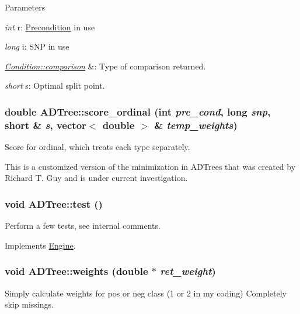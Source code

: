\begin{DoxyParams}{Parameters}
\item[{\em int}]r: \hyperlink{classPrecondition}{Precondition} in use \item[{\em long}]i: SNP in use \item[{\em \hyperlink{classCondition_af41afbd9545b1fb2e2cb4a4792d52408}{Condition::comparison}}]\&: Type of comparison returned. \item[{\em short}]s: Optimal split point. \end{DoxyParams}
\hypertarget{classADTree_ab9b3c82b61aff738c450bd3b03a27631}{
\subsubsection[{score\_\-ordinal}]{\setlength{\rightskip}{0pt plus 5cm}double ADTree::score\_\-ordinal (int {\em pre\_\-cond}, \/  long {\em snp}, \/  short \& {\em s}, \/  vector$<$ double $>$ \& {\em temp\_\-weights})}}
\label{classADTree_ab9b3c82b61aff738c450bd3b03a27631}
Score for ordinal, which treats each type separately.

This is a customized version of the minimization in ADTrees that was created by Richard T. Guy and is under current investigation. \hypertarget{classADTree_ac4183a7e36602b90e36e3717deef102c}{
\subsubsection[{test}]{\setlength{\rightskip}{0pt plus 5cm}void ADTree::test ()}}
\label{classADTree_ac4183a7e36602b90e36e3717deef102c}
Perform a few tests, see internal comments. 

Implements \hyperlink{classEngine_a2927c4a4263809453063ad482c6434a4}{Engine}.

\hypertarget{classADTree_a9026beb206f3f2f82c75e948876122da}{
\subsubsection[{weights}]{\setlength{\rightskip}{0pt plus 5cm}void ADTree::weights (double $\ast$ {\em ret\_\-weight})}}
\label{classADTree_a9026beb206f3f2f82c75e948876122da}
Simply calculate weights for pos or neg class (1 or 2 in my coding) Completely skip missings.


